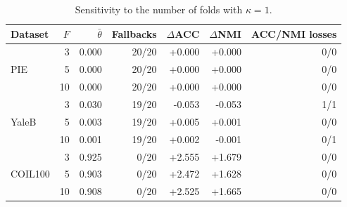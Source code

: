 \begin{table}[t]
\centering
\caption{Sensitivity to the number of folds with $\kappa=1$.}\label{tab:fold_sensitivity}
\small
\begin{tabular}{lrrrrrr}
\toprule
Dataset & $F$ & $\bar\theta$ & Fallbacks & $\Delta$ACC & $\Delta$NMI & ACC/NMI losses \\
\midrule
\multirow{3}{*}{PIE} & 3 & 0.000 & 20/20 & +0.000 & +0.000 & 0/0 \\
 & 5 & 0.000 & 20/20 & +0.000 & +0.000 & 0/0 \\
 & 10 & 0.000 & 20/20 & +0.000 & +0.000 & 0/0 \\
\midrule
\multirow{3}{*}{YaleB} & 3 & 0.030 & 19/20 & -0.053 & -0.053 & 1/1 \\
 & 5 & 0.003 & 19/20 & +0.005 & +0.001 & 0/0 \\
 & 10 & 0.001 & 19/20 & +0.002 & -0.001 & 0/1 \\
\midrule
\multirow{3}{*}{COIL100} & 3 & 0.925 & 0/20 & +2.555 & +1.679 & 0/0 \\
 & 5 & 0.903 & 0/20 & +2.472 & +1.628 & 0/0 \\
 & 10 & 0.908 & 0/20 & +2.525 & +1.665 & 0/0 \\
\bottomrule
\end{tabular}
\end{table}
